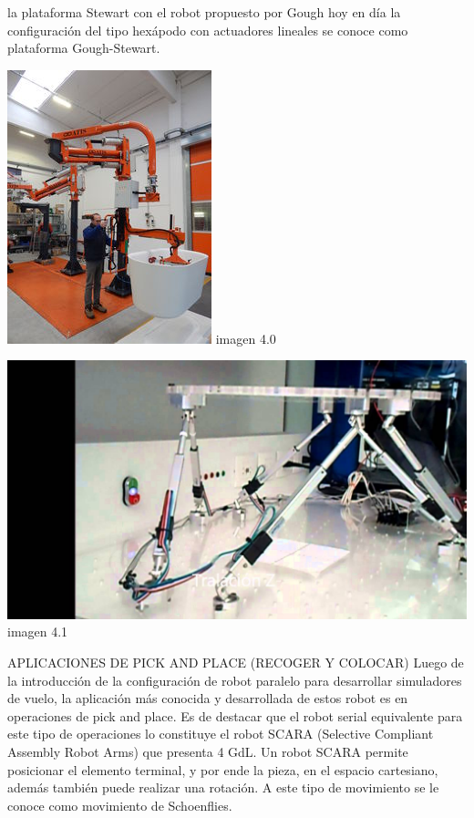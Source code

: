 \documentclass[10pt,a4paper]{article}
\begin{document}
la plataforma Stewart con el robot propuesto por Gough hoy en día la configuración del tipo hexápodo
con actuadores lineales se conoce como plataforma Gough-Stewart.
\begin{center}
\includegraphics[scale=3.1]{imagenes/aplicacion.png} imagen 4.0
\end{center}
\begin{center}
\includegraphics[scale=0.2]{imagenes/33.png} imagen 4.1
\end{center}
APLICACIONES DE PICK AND PLACE (RECOGER Y COLOCAR)
Luego de la introducción de la configuración de robot paralelo para desarrollar simuladores de 
vuelo, la aplicación más conocida y desarrollada de estos robot es en operaciones de pick and place. Es
de destacar que el robot serial equivalente para este tipo de operaciones lo constituye el robot SCARA
(Selective Compliant Assembly Robot Arms) que presenta 4 GdL. Un robot SCARA permite posicionar
el elemento terminal, y por ende la pieza, en el espacio cartesiano, además también puede realizar una
rotación. A este tipo de movimiento se le conoce como movimiento de Schoenflies.
\end{document}

